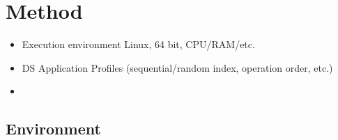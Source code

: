 \chapter{Method}

\begin{itemize}
  \item Execution environment {Linux, 64 bit, CPU/RAM/etc.}
  \item DS Application Profiles (sequential/random index, operation order,
  etc.)
  \item 
\end{itemize}

\section{Environment}